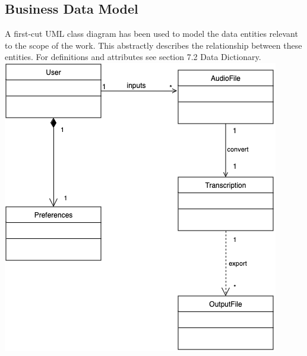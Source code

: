 \documentclass[12pt]{article}
\begin{document}
\subsection{Business Data Model}
A first-cut UML class diagram has been used to model the data entities relevant to the scope of the work. This
abstractly describes the relationship between these entities. For definitions and attributes see section 7.2 Data Dictionary.\\
\includegraphics[scale=0.75]{SRS-data-model.png}
\end{document}
